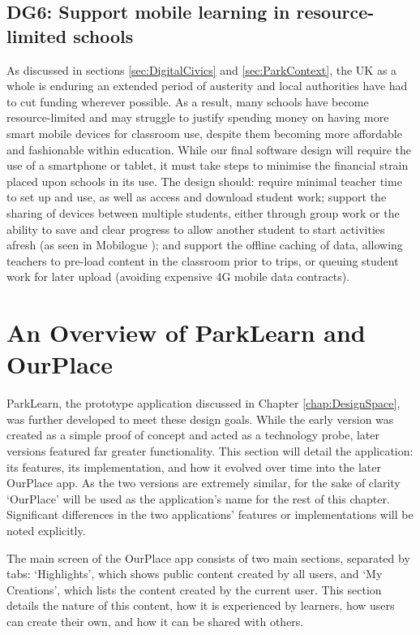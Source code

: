 \subsection*{ DG6: Support mobile learning in resource-limited schools }
\label{DG6}

As discussed in sections \ref{sec:DigitalCivics} and \ref{sec:ParkContext}, the UK as a whole is enduring an extended period of austerity and local authorities have had to cut funding wherever possible. As a result, many schools have become resource-limited and may struggle to justify spending money on having more smart mobile devices for classroom use, despite them becoming more affordable and fashionable within education. While our final software design will require the use of a smartphone or tablet, it must take steps to minimise the financial strain placed upon schools in its use. The design should: require minimal teacher time to set up and use, as well as access and download student work; support the sharing of devices between multiple students, either through group work or the ability to save and clear progress to allow another student to start activities afresh (as seen in Mobilogue \citep{Giemza2013}); and support the offline caching of data, allowing teachers to pre-load content in the classroom prior to trips, or queuing student work for later upload (avoiding expensive 4G mobile data contracts).

\section{An Overview of ParkLearn and OurPlace}

ParkLearn, the prototype application discussed in Chapter \ref{chap:DesignSpace}, was further developed to meet these design goals. While the early version was created as a simple proof of concept and acted as a technology probe, later versions featured far greater functionality. This section will detail the application: its features, its implementation, and how it evolved over time into the later OurPlace app. As the two versions are extremely similar, for the sake of clarity `OurPlace' will be used as the application's name for the rest of this chapter. Significant differences in the two applications' features or implementations will be noted explicitly.

The main screen of the OurPlace app consists of two main sections, separated by tabs: `Highlights', which shows public content created by all users, and `My Creations', which lists the content created by the current user. This section details the nature of this content, how it is experienced by learners, how users can create their own, and how it can be shared with others.

